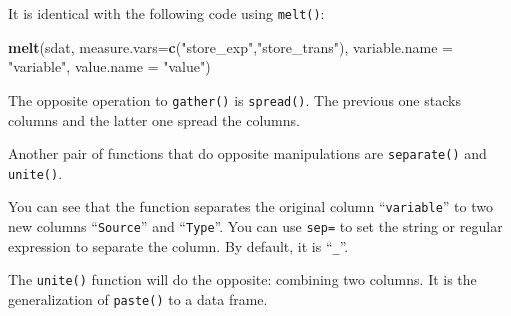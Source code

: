 \documentclass[12pt,]{krantz}
\makeatletter
\newenvironment{Shaded}{\begin{snugshade}}{\end{snugshade}}
\newcommand{\KeywordTok}[1]{\textcolor[rgb]{0.27,0.27,0.27}{\textbf{#1}}}
\newcommand{\DataTypeTok}[1]{\textcolor[rgb]{0.27,0.27,0.27}{#1}}
\newcommand{\StringTok}[1]{\textcolor[rgb]{0.5,0.5,0.5}{#1}}
\newcommand{\OperatorTok}[1]{\textcolor[rgb]{0.43,0.43,0.43}{\textbf{#1}}}
\newcommand{\NormalTok}[1]{#1}
\newenvironment{kframe}{%
\medskip{}
\setlength{\fboxsep}{.8em}
 \def\at@end@of@kframe{}%
 \ifinner\ifhmode%
  \def\at@end@of@kframe{\end{minipage}}%
  \begin{minipage}{\columnwidth}%
 \fi\fi%
 \def\FrameCommand##1{\hskip\@totalleftmargin \hskip-\fboxsep
 \colorbox{shadecolor}{##1}\hskip-\fboxsep
     \hskip-\linewidth \hskip-\@totalleftmargin \hskip\columnwidth}%
 \MakeFramed {\advance\hsize-\width
   \@totalleftmargin\z@ \linewidth\hsize
   \@setminipage}}%
 {\par\unskip\endMakeFramed%
 \at@end@of@kframe}
\renewenvironment{Shaded}{\begin{kframe}}{\end{kframe}}
\theoremstyle{definition}
\theoremstyle{definition}
\theoremstyle{definition}
\theoremstyle{remark}
\makeatother
\begin{document}
It is identical with the following code using \texttt{melt()}:

\begin{Shaded}
\begin{Highlighting}[]
\KeywordTok{melt}\NormalTok{(sdat, }\DataTypeTok{measure.vars=}\KeywordTok{c}\NormalTok{(}\StringTok{"store_exp"}\NormalTok{,}\StringTok{"store_trans"}\NormalTok{),}
            \DataTypeTok{variable.name =} \StringTok{"variable"}\NormalTok{,}
              \DataTypeTok{value.name =} \StringTok{"value"}\NormalTok{)}
\end{Highlighting}
\end{Shaded}

The opposite operation to \texttt{gather()} is \texttt{spread()}. The
previous one stacks columns and the latter one spread the columns.

\begin{Shaded}
\end{Shaded}

Another pair of functions that do opposite manipulations are
\texttt{separate()} and \texttt{unite()}.

\begin{Shaded}
\end{Shaded}

You can see that the function separates the original column
``\texttt{variable}'' to two new columns ``\texttt{Source}'' and
``\texttt{Type}''. You can use \texttt{sep=} to set the string or
regular expression to separate the column. By default, it is
``\texttt{\_}''.

The \texttt{unite()} function will do the opposite: combining two
columns. It is the generalization of \texttt{paste()} to a data frame.

\begin{Shaded}
\end{Shaded}
\end{document}
